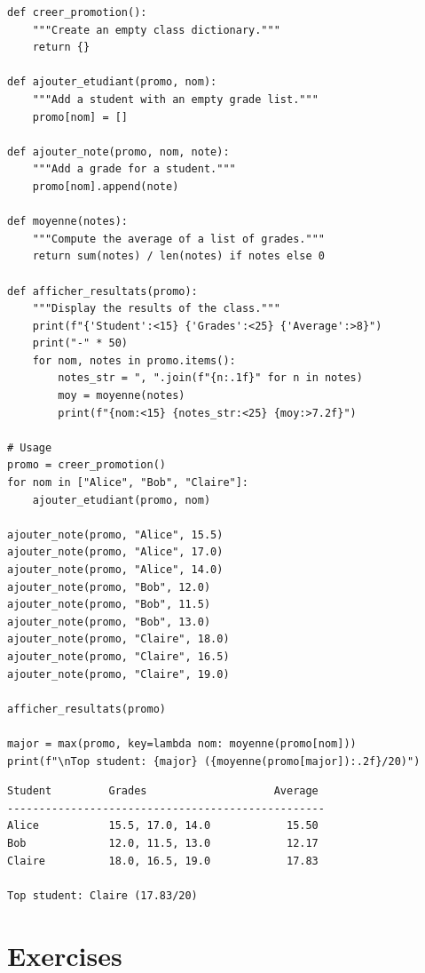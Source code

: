 \begin{codeblock}[title=\textbf{Python}]
\begin{verbatim}
def creer_promotion():
    """Create an empty class dictionary."""
    return {}

def ajouter_etudiant(promo, nom):
    """Add a student with an empty grade list."""
    promo[nom] = []

def ajouter_note(promo, nom, note):
    """Add a grade for a student."""
    promo[nom].append(note)

def moyenne(notes):
    """Compute the average of a list of grades."""
    return sum(notes) / len(notes) if notes else 0

def afficher_resultats(promo):
    """Display the results of the class."""
    print(f"{'Student':<15} {'Grades':<25} {'Average':>8}")
    print("-" * 50)
    for nom, notes in promo.items():
        notes_str = ", ".join(f"{n:.1f}" for n in notes)
        moy = moyenne(notes)
        print(f"{nom:<15} {notes_str:<25} {moy:>7.2f}")

# Usage
promo = creer_promotion()
for nom in ["Alice", "Bob", "Claire"]:
    ajouter_etudiant(promo, nom)

ajouter_note(promo, "Alice", 15.5)
ajouter_note(promo, "Alice", 17.0)
ajouter_note(promo, "Alice", 14.0)
ajouter_note(promo, "Bob", 12.0)
ajouter_note(promo, "Bob", 11.5)
ajouter_note(promo, "Bob", 13.0)
ajouter_note(promo, "Claire", 18.0)
ajouter_note(promo, "Claire", 16.5)
ajouter_note(promo, "Claire", 19.0)

afficher_resultats(promo)

major = max(promo, key=lambda nom: moyenne(promo[nom]))
print(f"\nTop student: {major} ({moyenne(promo[major]):.2f}/20)")
\end{verbatim}
\end{codeblock}

\begin{codeoutput}
\begin{verbatim}
Student         Grades                    Average
--------------------------------------------------
Alice           15.5, 17.0, 14.0            15.50
Bob             12.0, 11.5, 13.0            12.17
Claire          18.0, 16.5, 19.0            17.83

Top student: Claire (17.83/20)
\end{verbatim}
\end{codeoutput}

\section{Exercises}

